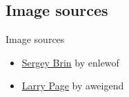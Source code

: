 \subsection{Image sources}
\begin{frame}{Image sources}
    \begin{itemize}
        \item \href{http://commons.wikimedia.org/wiki/File:Sergey_Brin.JPG}{Sergey Brin} by enlewof
        \item \href{http://commons.wikimedia.org/wiki/File:Larry_Page_laughs.jpg}{Larry Page} by aweigend
    \end{itemize}
\end{frame}
